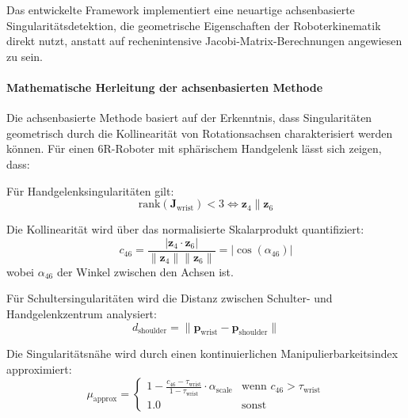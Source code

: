 Das entwickelte Framework implementiert eine neuartige achsenbasierte
Singularitätsdetektion, die geometrische Eigenschaften der Roboterkinematik
direkt nutzt, anstatt auf rechenintensive Jacobi-Matrix-Berechnungen angewiesen
zu sein.

\paragraph{Mathematische Herleitung der achsenbasierten Methode}
Die achsenbasierte Methode basiert auf der Erkenntnis, dass Singularitäten
geometrisch durch die Kollinearität von Rotationsachsen charakterisiert werden
können. Für einen 6R-Roboter mit sphärischem Handgelenk lässt sich zeigen,
dass:

Für Handgelenksingularitäten gilt:
\begin{equation}
    \text{rank}(\mathbf{J}_{\text{wrist}}) < 3 \Leftrightarrow \mathbf{z}_4 \parallel \mathbf{z}_6
    \label{eq:wrist_rank_condition}
\end{equation}

Die Kollinearität wird über das normalisierte Skalarprodukt quantifiziert:
\begin{equation}
    c_{46} = \frac{|\mathbf{z}_4 \cdot \mathbf{z}_6|}{\|\mathbf{z}_4\| \|\mathbf{z}_6\|} = |\cos(\alpha_{46})|
    \label{eq:collinearity_measure}
\end{equation}
wobei $\alpha_{46}$ der Winkel zwischen den Achsen ist.

Für Schultersingularitäten wird die Distanz zwischen Schulter- und
Handgelenkzentrum analysiert:
\begin{equation}
    d_{\text{shoulder}} = \|\mathbf{p}_{\text{wrist}} - \mathbf{p}_{\text{shoulder}}\|
    \label{eq:shoulder_distance}
\end{equation}

Die Singularitätsnähe wird durch einen kontinuierlichen Manipulierbarkeitsindex
approximiert:
\begin{equation}
    \mu_{\text{approx}} = \begin{cases}
        1 - \frac{c_{46} - \tau_{\text{wrist}}}{1 - \tau_{\text{wrist}}} \cdot \alpha_{\text{scale}} & \text{wenn } c_{46} > \tau_{\text{wrist}} \\
        1.0                                                                                          & \text{sonst}
    \end{cases}
    \label{eq:manipulability_approximation}
\end{equation}

